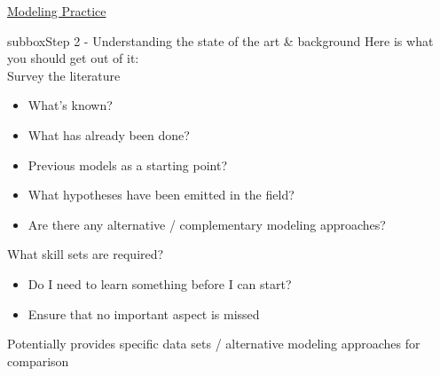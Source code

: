 \begin{textbox}{\href{https://compneuro.neuromatch.io/projects/modelingsteps/ModelingSteps_5through10.html}{Modeling Practice } }

\begin{subbox}{subbox}{Step 2 - Understanding the state of the art \& background}
\scriptsize
Here is what you should get out of it:\\
Survey the literature
\begin{itemize}
    \item 
   What’s known?
  \item  What has already been done?
  \item  Previous models as a starting point?
  \item  What hypotheses have been emitted in the field?
  \item  Are there any alternative / complementary modeling approaches?
  \end{itemize}

What skill sets are required?
\begin{itemize}

  \item  Do I need to learn something before I can start?
  \item  Ensure that no important aspect is missed
  \end{itemize}

Potentially provides specific data sets / alternative modeling approaches for comparison

\end{subbox}

\end{textbox}
